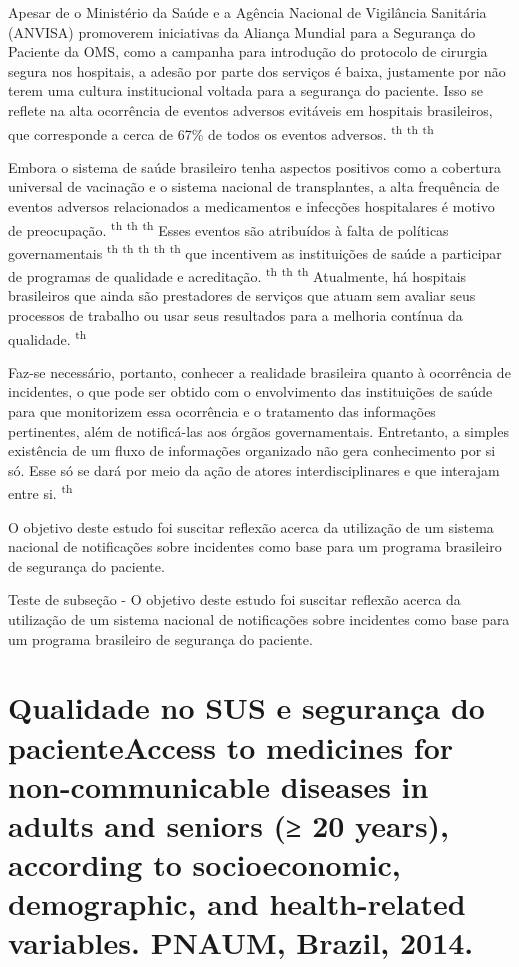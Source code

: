 \documentclass{article}
\begin{document}
Apesar de o Ministério da Saúde e a Agência Nacional de Vigilância Sanitária
(ANVISA)
promoverem iniciativas da Aliança Mundial para a Segurança do Paciente da OMS,
como a
campanha para introdução do protocolo de cirurgia segura nos hospitais, a adesão
por parte
dos serviços é baixa, justamente por não terem uma cultura institucional voltada
para a
segurança do paciente. Isso se reflete na alta ocorrência de eventos adversos
evitáveis em
hospitais brasileiros, que corresponde a cerca de 67\% de todos os eventos
adversos. \textsuperscript{th}
\textsuperscript{th}
\textsuperscript{th}

Embora o sistema de saúde brasileiro tenha aspectos positivos como a cobertura
universal de
vacinação e o sistema nacional de transplantes, a alta frequência de eventos
adversos
relacionados a medicamentos e infecções hospitalares é motivo de preocupação.
\textsuperscript{th}
\textsuperscript{th}
\textsuperscript{th}
Esses eventos são atribuídos à falta de políticas governamentais
\textsuperscript{th}
\textsuperscript{th}
\textsuperscript{th}
\textsuperscript{th}
\textsuperscript{th}
que incentivem as instituições de saúde a participar de programas de qualidade e
acreditação. \textsuperscript{th}
\textsuperscript{th}
\textsuperscript{th}
Atualmente, há hospitais brasileiros que ainda são prestadores de serviços que
atuam
sem avaliar seus processos de trabalho ou usar seus resultados para a melhoria
contínua da
qualidade. \textsuperscript{th}

Faz-se necessário, portanto, conhecer a realidade brasileira quanto à ocorrência
de
incidentes, o que pode ser obtido com o envolvimento das instituições de saúde
para que
monitorizem essa ocorrência e o tratamento das informações pertinentes, além de
notificá-las
aos órgãos governamentais. Entretanto, a simples existência de um fluxo de
informações
organizado não gera conhecimento por si só. Esse só se dará por meio da ação de
atores
interdisciplinares e que interajam entre si. \textsuperscript{th}

O objetivo deste estudo foi suscitar reflexão acerca da utilização de um sistema
nacional
de notificações sobre incidentes como base para um programa brasileiro de
segurança do
paciente.

Teste de subseção - O objetivo deste estudo foi suscitar reflexão acerca da
utilização de um sistema nacional
de notificações sobre incidentes como base para um programa brasileiro de
segurança do
paciente.

\section{Qualidade no SUS e segurança do pacienteAccess to medicines for
non-communicable diseases in adults and seniors (≥ 20 years), according to
socioeconomic, demographic, and health-related variables. PNAUM, Brazil, 2014.}
\end{document}
